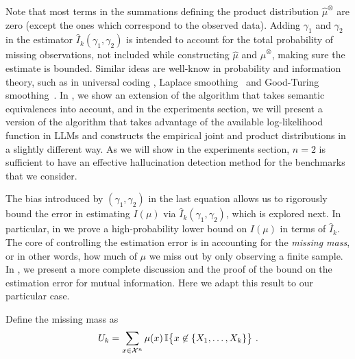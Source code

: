 \documentclass[a4paper]{article}
\theoremstyle{plain}
\theoremstyle{definition}
\theoremstyle{plain}
\begin{document}
%
Note that most terms in the summations defining the product distribution $\widehat \mu^{\otimes}$ are zero (except the ones which correspond to the observed data). Adding $\gamma_1$ and $\gamma_2$ in the estimator $\widehat I_k(\gamma_1, \gamma_2)$ is intended to account for the
total probability of missing observations, not included while constructing
$\widehat \mu$ and $\widehat \mu^\otimes$, making sure the estimate is bounded. Similar ideas are well-know in probability and
information theory, such as in universal coding \citep{cesa2006prediction}, Laplace smoothing~\citep{polyanskiy2024information}
and Good-Turing smoothing~\citep{gale1995good,mcallester2000convergence}. In , we show an extension of the algorithm that takes semantic equivalences into account, and in the experiments section, we will present a version of the algorithm that takes advantage of the available log-likelihood function in LLMs and constructs the empirical joint and product distributions in a slightly different way. As we will show in the experiments section, $n=2$ is sufficient to have an effective hallucination detection method for the benchmarks that we consider.

The bias introduced by $(\gamma_1, \gamma_2)$ in the last equation allows us to rigorously bound the error in estimating $I(\mu)$ via $\widehat I_k(\gamma_1, \gamma_2)$, which is explored next.
%
In particular, in  we prove a high-probability lower bound on
$I(\mu)$ in terms of $\widehat I_k$.  The core of
controlling the estimation error is in accounting for the \emph{missing mass},
or in other words, how much of $\mu$ we miss out by
only observing a finite sample.  In , we present a more complete
discussion and the proof of the bound on the estimation error for mutual information.
%
Here we adapt this result to our particular case. 

Define the missing mass as
%
\begin{align*}
  U_k = \sum_{x \in {\mathcal{X}}^n} \mu(x)
  \,
  \mathbb{I}\big\{x \not \in \{X_1, \ldots, X_k\} \big\}~.
\end{align*}
\end{document}
